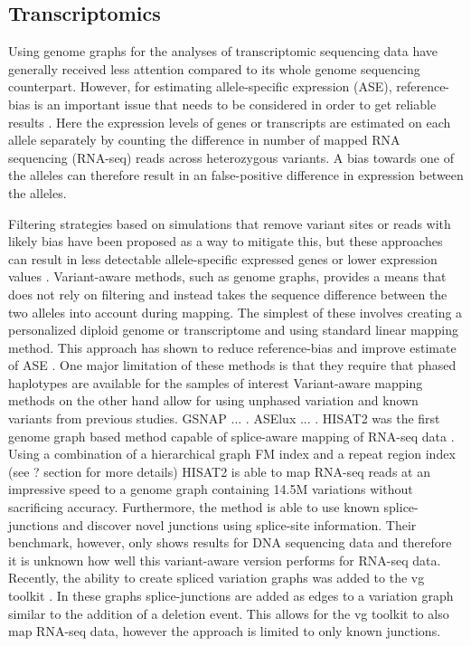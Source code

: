 \subsection{Transcriptomics}

Using genome graphs for the analyses of transcriptomic sequencing data have generally received less attention compared to its whole genome sequencing counterpart.
However, for estimating allele-specific expression (ASE), reference-bias is an important issue that needs to be considered in order to get reliable results \cite{Degner2009-vw,Castel2015-ef}.
Here the expression levels of genes or transcripts are estimated on each allele separately by counting the difference in number of mapped RNA sequencing (RNA-seq) reads across heterozygous variants.
A bias towards one of the alleles can therefore result in an false-positive difference in expression between the alleles.

Filtering strategies based on simulations that remove variant sites or reads with likely bias have been proposed as a way to mitigate this, but these approaches can result in less detectable allele-specific expressed genes or lower expression values \cite{Castel2015-ef,Van_de_Geijn2015-dz}.
Variant-aware methods, such as genome graphs, provides a means that does not rely on filtering and instead takes the sequence difference between the two alleles into account during mapping.
The simplest of these involves creating a personalized diploid genome or transcriptome and using standard linear mapping method.
This approach has shown to reduce reference-bias and improve estimate of ASE \cite{Rozowsky_2011,Raghupathy2018-sd,Lee2018-mm}.
One major limitation of these methods is that they require that phased haplotypes are available for the samples of interest 
Variant-aware mapping methods on the other hand allow for using unphased variation and known variants from previous studies.
GSNAP ... \cite{Wu2010-hv}. 
ASElux ... \cite{Miao2018-ps}.
HISAT2 was the first genome graph based method capable of splice-aware mapping of RNA-seq data \cite{Kim_2019}. 
Using a combination of a hierarchical graph FM index and a repeat region index (see ? section for more details) HISAT2 is able to map RNA-seq reads at an impressive speed to a genome graph containing 14.5M variations without sacrificing accuracy. 
Furthermore, the method is able to use known splice-junctions and discover novel junctions using splice-site information.
Their benchmark, however, only shows results for DNA sequencing data and therefore it is unknown how well this variant-aware version performs for RNA-seq data.
Recently, the ability to create spliced variation graphs was added to the vg toolkit \cite{Garrison_2018}. 
In these graphs splice-junctions are added as edges to a variation graph similar to the addition of a deletion event. 
This allows for the vg toolkit to also map RNA-seq data, however the approach is limited to only known junctions.

